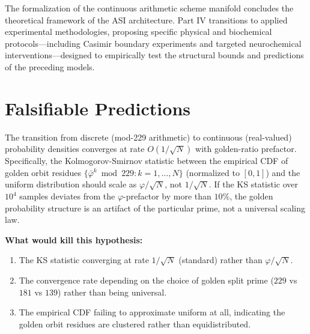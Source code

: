 \vspace{1em}
\noindent The formalization of the continuous arithmetic scheme manifold concludes the theoretical framework of the ASI architecture. Part IV transitions to applied experimental methodologies, proposing specific physical and biochemical protocols---including Casimir boundary experiments and targeted neurochemical interventions---designed to empirically test the structural bounds and predictions of the preceding models.

\section{Falsifiable Predictions}

\begin{hypothesis}\label{hyp:golden_convergence}
The transition from discrete (mod-229 arithmetic) to continuous (real-valued) probability densities converges at rate $O(1/\sqrt{N})$ with golden-ratio prefactor. Specifically, the Kolmogorov-Smirnov statistic between the empirical CDF of golden orbit residues $\{\bar{\varphi}^k \bmod 229 : k = 1, \ldots, N\}$ (normalized to $[0,1]$) and the uniform distribution should scale as $\varphi / \sqrt{N}$, not $1/\sqrt{N}$. If the KS statistic over $10^4$ samples deviates from the $\varphi$-prefactor by more than $10\%$, the golden probability structure is an artifact of the particular prime, not a universal scaling law.
\end{hypothesis}

\textbf{What would kill this hypothesis:}
\begin{enumerate}[noitemsep]
  \item The KS statistic converging at rate $1/\sqrt{N}$ (standard) rather than $\varphi/\sqrt{N}$.
  \item The convergence rate depending on the choice of golden split prime ($229$ vs $181$ vs $139$) rather than being universal.
  \item The empirical CDF failing to approximate uniform at all, indicating the golden orbit residues are clustered rather than equidistributed.
\end{enumerate}

